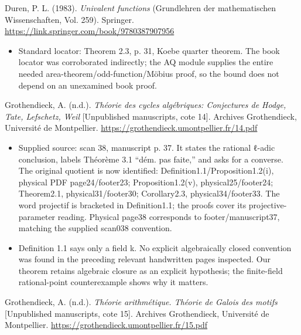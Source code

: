 \documentclass[11pt,a4paper]{article}
\providecommand{\tightlist}{\setlength{\itemsep}{0pt}\setlength{\parskip}{0pt}}
\theoremstyle{definition}\newtheorem{definition}[theorem]{Definition}
\theoremstyle{remark}\newtheorem{remark}[theorem]{Remark}
\begin{document}
Duren, P. L. (1983). \emph{Univalent functions} (Grundlehren der
mathematischen Wissenschaften, Vol. 259). Springer.
\url{https://link.springer.com/book/9780387907956}

\begin{itemize}
\tightlist
\item
  Standard locator: Theorem 2.3, p. 31, Koebe quarter theorem. The book
  locator was corroborated indirectly; the AQ module supplies the entire
  needed area-theorem/odd-function/Möbius proof, so the bound does not
  depend on an unexamined book proof.
\end{itemize}

Grothendieck, A. (n.d.). \emph{Théorie des cycles algébriques:
Conjectures de Hodge, Tate, Lefschetz, Weil} {[}Unpublished manuscripts,
cote 14{]}. Archives Grothendieck, Université de Montpellier.
\url{https://grothendieck.umontpellier.fr/14.pdf}

\begin{itemize}
\tightlist
\item
  Supplied source: scan 38, manuscript p. 37. It states the rational
  ℓ-adic conclusion, labels Théorème 3.1 ``dém. pas faite,'' and asks
  for a converse. The original quotient is now identified:
  Definition1.1/Proposition1.2(i), physical PDF page24/footer23;
  Proposition1.2(v), physical25/footer24; Theorem2.1,
  physical31/footer30; Corollary2.3, physical34/footer33. The word
  projectif is bracketed in Definition1.1; the proofs cover its
  projective-parameter reading. Physical page38 corresponds to
  footer/manuscript37, matching the supplied scan038 convention.
\item
  Definition 1.1 says only a field k. No explicit algebraically closed
  convention was found in the preceding relevant handwritten pages
  inspected. Our theorem retains algebraic closure as an explicit
  hypothesis; the finite-field rational-point counterexample shows why
  it matters.
\end{itemize}

Grothendieck, A. (n.d.). \emph{Théorie arithmétique. Théorie de Galois
des motifs} {[}Unpublished manuscripts, cote 15{]}. Archives
Grothendieck, Université de Montpellier.
\url{https://grothendieck.umontpellier.fr/15.pdf}
\end{document}
